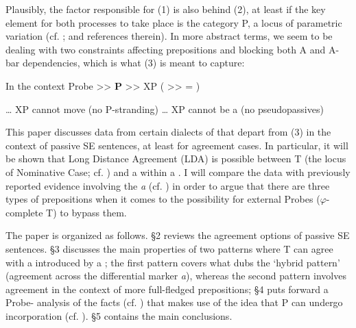 \documentclass[output=paper]{langsci/langscibook}
\begin{document}
    \z

Plausibly, the factor responsible for (1) is also behind (2), at least if the key element for both processes to take place is the category P, a locus of parametric variation (cf. \citealt{Hornstein1981,Kayne1984,Kayne1994,Kayne2005,Abels2003}; and references therein). In more abstract terms, we seem to be dealing with two constraints affecting prepositions and blocking both A and A-bar dependencies, which is what (3) is meant to capture:

\ea%
    \label{ex:gallego:3}
     In the context Probe >>  \textbf{P}  >>  XP  ( >> = )\\
     \begin{xlisti}\setcounter{xnumii}{1}
     \ex \ldots\xspace XP cannot move (no P-stranding)
     \ex \ldots\xspace XP cannot be a  (no pseudopassives)
     \end{xlisti}
\z

This paper discusses data from certain dialects of  that depart from (3) in the context of passive SE sentences, at least for agreement cases. In particular, it will be shown that Long Distance Agreement (LDA) is possible between T (the locus of Nominative Case; cf. \citealt{Chomsky2000,Chomsky2001Derivation}) and a \CATDP {} within a \CATPP. I will compare the data with previously reported evidence involving the   \textit{a} (cf. \citealt{Torrego1998,López2012}) in order to argue that there are three types of prepositions when it comes to the possibility for external Probes ($\varphi $-complete T) to bypass them.

The paper is organized as follows. §2 reviews the agreement options of passive SE sentences. §3 discusses the main properties of two patterns where T can agree with a \CATDP introduced by a ; the first pattern covers what \citet{RAE-ASALE2009} dubs the ‘hybrid pattern’ (agreement across the differential marker \textit{a}), whereas the second pattern involves agreement in the context of more full-fledged prepositions; §4 puts forward a Probe- analysis of the facts (cf. \citealt{Chomsky2000,Chomsky2001Derivation}) that makes use of the idea that P can undergo incorporation (cf. \citealt{Hornstein1981,Law2006}). §5 contains the main conclusions.
\end{document}
